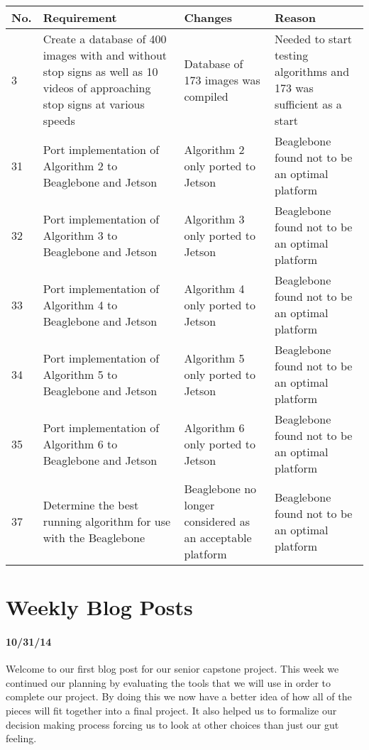 \documentclass[letterpaper,10pt,titlepage]{article}
\begin{document}
\begin{center}
    \begin{tabular}{ | l | p{5cm} | p{5cm} | p{5cm} | }
    \hline
    No. & Requirement & Changes & Reason \\ \hline
    3 & Create a database of 400 images with and without stop signs as well as
    10 videos of approaching stop signs at various speeds & Database of 173
    images was compiled & Needed to start testing algorithms and 173 was
    sufficient as a start \\ \hline
    31 & Port implementation of Algorithm 2 to Beaglebone and Jetson & 
    Algorithm 2 only ported to Jetson & Beaglebone found not to be an optimal
    platform \\ \hline
    32 & Port implementation of Algorithm 3 to Beaglebone and Jetson & 
    Algorithm 3 only ported to Jetson & Beaglebone found not to be an optimal
    platform \\ \hline
    33 & Port implementation of Algorithm 4 to Beaglebone and Jetson & 
    Algorithm 4 only ported to Jetson & Beaglebone found not to be an optimal
    platform \\ \hline
    34 & Port implementation of Algorithm 5 to Beaglebone and Jetson & 
    Algorithm 5 only ported to Jetson & Beaglebone found not to be an optimal
    platform \\ \hline
    35 & Port implementation of Algorithm 6 to Beaglebone and Jetson & 
    Algorithm 6 only ported to Jetson & Beaglebone found not to be an optimal
    platform \\ \hline
    37 & Determine the best running algorithm for use with the Beaglebone &
    Beaglebone no longer considered as an acceptable platform & Beaglebone 
    found not to be an optimal platform \\ \hline
    \end{tabular}
\end{center}

\section*{Weekly Blog Posts}
    \paragraph*{10/31/14}
    Welcome to our first blog post for our senior capstone project. This week
    we continued our planning by evaluating the tools that we will use in order
    to complete our project. By doing this we now have a better idea of how all
    of the pieces will fit together into a final project. It also helped us to
    formalize our decision making process forcing us to look at other choices
    than just our gut feeling.
\end{document}
